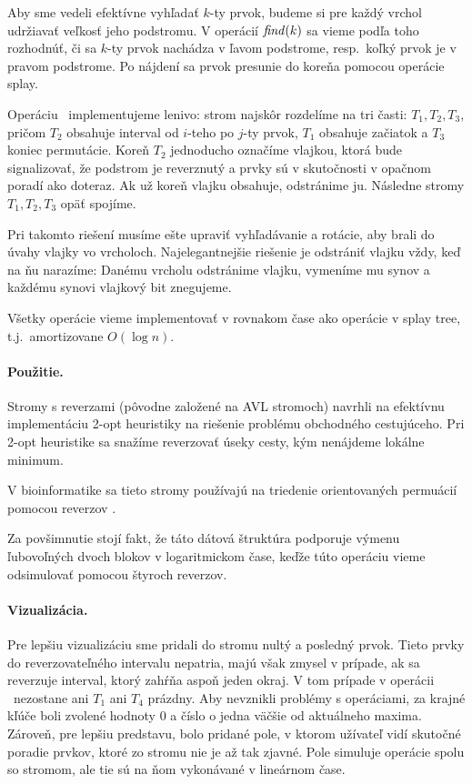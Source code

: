 
Aby sme vedeli efektívne vyhľadať $k$-ty prvok, budeme si pre každý vrchol udržiavať veľkosť jeho
podstromu. V operácií $\mathop{\mathit{find}}(k)$ sa vieme podľa toho rozhodnúť, či sa $k$-ty prvok nachádza v ľavom podstrome,
resp.\ koľký prvok je v pravom podstrome. Po nájdení sa prvok presunie do koreňa pomocou operácie splay.

Operáciu \reverse\ implementujeme lenivo:
strom najskôr rozdelíme na tri časti: $T_1,T_2,T_3$, pričom $T_2$ obsahuje interval od $i$-teho
po $j$-ty prvok, $T_1$ obsahuje začiatok a $T_3$ koniec permutácie. Koreň $T_2$ jednoducho
označíme vlajkou, ktorá bude signalizovať, že podstrom je reverznutý a prvky sú v skutočnosti
v opačnom poradí ako doteraz. Ak už koreň vlajku obsahuje, odstránime ju.
Následne stromy $T_1,T_2,T_3$ opäť spojíme.

Pri takomto riešení musíme ešte upraviť vyhľadávanie a rotácie, aby brali do úvahy vlajky vo vrcholoch.
Najelegantnejšie riešenie je odstrániť vlajku vždy, keď na ňu narazíme:
Danému vrcholu odstránime vlajku, vymeníme mu synov a každému synovi vlajkový bit znegujeme.

Všetky operácie vieme implementovať v rovnakom čase ako operácie v splay tree, t.j.\ amortizovane $O(\log n)$.

\paragraph{Použitie.}
Stromy s reverzami (pôvodne založené na AVL stromoch) navrhli \citet{chrobak}
na efektívnu implementáciu 2-opt heuristiky na riešenie problému obchodného cestujúceho.
Pri 2-opt heuristike sa snažíme reverzovať úseky cesty, kým nenájdeme lokálne minimum.

V bioinformatike sa tieto stromy používajú na triedenie orientovaných permuácií
pomocou reverzov \citep{reversals, reversals2}.

Za povšimnutie stojí fakt, že táto dátová štruktúra podporuje výmenu ľubovoľných dvoch blokov
v logaritmickom čase, keďže túto operáciu vieme odsimulovať pomocou štyroch reverzov.

\paragraph{Vizualizácia.}
Pre lepšiu vizualizáciu sme pridali do stromu nultý a posledný prvok. Tieto prvky
do reverzovateľného intervalu nepatria, majú však zmysel v prípade, ak sa reverzuje
interval, ktorý zahŕňa aspoň jeden okraj. V tom prípade v operácii \reverse\ nezostane
ani $T_1$ ani $T_4$ prázdny. Aby nevznikli problémy s operáciami, za krajné kľúče boli
zvolené hodnoty $0$ a číslo o jedna väčšie od aktuálneho maxima. Zároveň, pre lepšiu
predstavu, bolo pridané pole, v ktorom užívateľ vidí skutočné poradie prvkov, ktoré
zo stromu nie je až tak zjavné. Pole simuluje operácie spolu so stromom, ale tie sú
na ňom vykonávané v lineárnom čase.